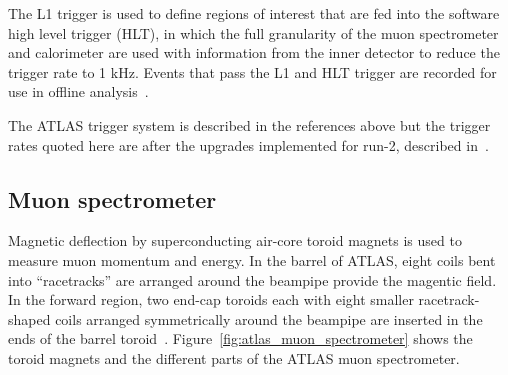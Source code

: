 
The L1 trigger is used to define regions of interest that are fed into the software high level trigger (HLT), in which the full granularity of the muon spectrometer and calorimeter are used with information from the inner detector to reduce the trigger rate to 1 kHz. Events that pass the L1 and HLT trigger are recorded for use in offline analysis~\cite{atlas_hlt_trigger_tdr}.

The ATLAS trigger system is described in the references above but the trigger rates quoted here are after the upgrades implemented for run-2, described in~\cite{martinez_run-2_2016}.

\subsection{Muon spectrometer}

Magnetic deflection by superconducting air-core toroid magnets is used to measure muon momentum and energy. In the barrel of ATLAS, eight coils bent into ``racetracks'' are arranged around the beampipe provide the magentic field. In the forward region, two end-cap toroids each with eight smaller racetrack-shaped coils arranged symmetrically around the beampipe are inserted in the ends of the barrel toroid~\cite{atlas_magnet_tdr}. Figure~\ref{fig:atlas_muon_spectrometer} shows the toroid magnets and the different parts of the ATLAS muon spectrometer.

